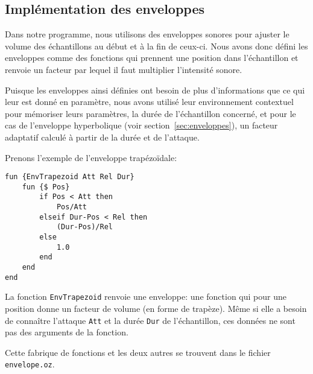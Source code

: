 \documentclass[a4paper,12pt]{article}
\begin{document}
\subsection{Implémentation des enveloppes}
\label{sec:impl_enveloppes}

Dans notre programme, nous utilisons des enveloppes sonores pour ajuster
le volume des échantillons au début et à la fin de ceux-ci.
Nous avons donc défini les enveloppes comme des fonctions qui prennent
une position dans l'échantillon et renvoie un facteur par lequel il faut
multiplier l'intensité sonore.

Puisque les enveloppes ainsi définies ont besoin de plus d'informations que ce
qui leur est donné en paramètre, nous avons utilisé leur environnement
contextuel pour mémoriser leurs paramètres, la durée de l'échantillon concerné,
et pour le cas de l'enveloppe hyperbolique (voir section~\ref{sec:enveloppes}),
un facteur adaptatif calculé à partir de la durée et de l'attaque.

Prenons l'exemple de l'enveloppe trapézoïdale:
\begin{lstlisting}
fun {EnvTrapezoid Att Rel Dur}
    fun {$ Pos}
        if Pos < Att then
            Pos/Att
        elseif Dur-Pos < Rel then
            (Dur-Pos)/Rel
        else
            1.0
        end
    end
end
\end{lstlisting}

La fonction \texttt{EnvTrapezoid} renvoie une enveloppe:
une fonction qui pour une position donne un facteur de volume
(en forme de trapèze).
Même si elle a besoin de connaître l'attaque \texttt{Att} et la durée
\texttt{Dur} de l'échantillon, ces données ne sont pas des arguments de la
fonction.

Cette fabrique de fonctions et les deux autres se trouvent dans le fichier
\texttt{envelope.oz}.
\end{document}
